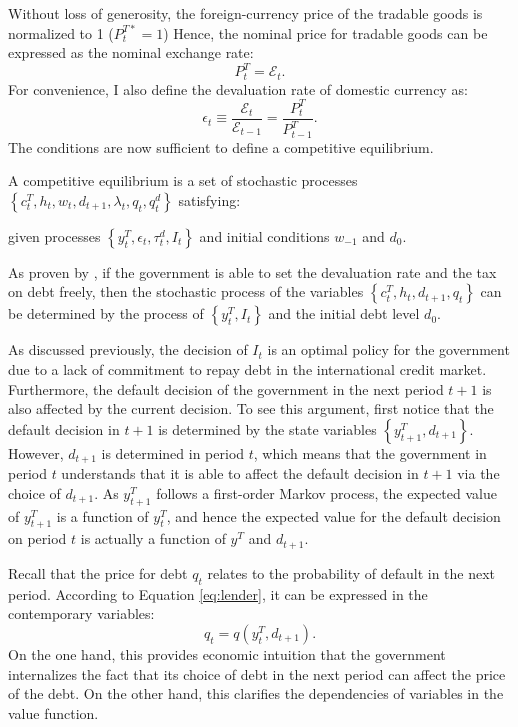 Without loss of generosity, the foreign-currency price of the tradable goods is normalized to 1 ($P^{T*}_t = 1$)
Hence, the nominal price for tradable goods can be expressed as the nominal exchange rate:
\begin{equation}
    \label{eq:price-exrate}
    P^T_t = \mathcal{E}_t.
\end{equation}
For convenience, I also define the devaluation rate of domestic currency as:
\begin{equation}
    \label{eq:devaluation-rate}
    \epsilon_t \equiv \frac{\mathcal{E}_t}{\mathcal{E}_{t-1}} = \frac{P^T_t}{P^T_{t-1}}.
\end{equation}
The conditions are now sufficient to define a competitive equilibrium.
\begin{definition}
    A competitive equilibrium is a set of stochastic processes $\left\{ c^T_t, h_t, w_t, d_{t+1}, \lambda_t, q_t, q^d_t \right\}$ satisfying:
    
    given processes $\left\{ y^T_t, \epsilon_t, \tau^d_t, I_t \right\}$ and initial conditions $w_{-1}$ and $d_0$.
\end{definition}
As proven by \citet{Na-18}, if the government is able to set the devaluation rate and the tax on debt freely, then the stochastic process of the variables $\left\{ c^T_t, h_t, d_{t+1}, q_t \right\}$ can be determined by the process of $\left\{ y^T_t, I_t\right\}$ and the initial debt level $d_0$.

As discussed previously, the decision of $I_t$ is an optimal policy for the government due to a lack of commitment to repay debt in the international credit market. Furthermore, the default decision of the government in the next period $t+1$ is also affected by the current decision. To see this argument, first notice that the default decision in $t+1$ is determined by the state variables $\left\{ y^T_{t+1}, d_{t+1} \right\}$. However, $d_{t+1}$ is determined in period $t$, which means that the government in period $t$ understands that it is able to affect the default decision in $t+1$ via the choice of $d_{t+1}$. As $y^T_{t+1}$ follows a first-order Markov process, the expected value of $y^T_{t+1}$ is a function of $y^T_t$, and hence the expected value for the default decision on period $t$ is actually a function of $y^T$ and $d_{t+1}$.

Recall that the price for debt $q_t$ relates to the probability of default in the next period. According to Equation \eqref{eq:lender}, it can be expressed in the contemporary variables:
\begin{equation}
    q_t = q(y^T_t, d_{t+1}).
\end{equation}
On the one hand, this provides economic intuition that the government internalizes the fact that its choice of debt in the next period can affect the price of the debt. On the other hand, this clarifies the dependencies of variables in the value function.
